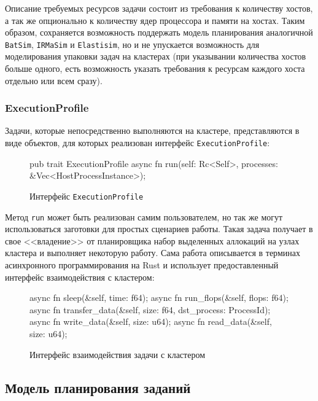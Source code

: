 Описание требуемых ресурсов задачи состоит из требования к количеству хостов, а так же опционально к количеству ядер процессора и памяти на хостах. Таким образом, сохраняется возможность поддержать модель планирования аналогичной \texttt{BatSim}, \texttt{IRMaSim} и \texttt{Elastisim}, но и не упускается возможность для моделирования упаковки задач на кластерах (при указывании количества хостов больше одного,  есть возможность указать требования к ресурсам каждого хоста отдельно или всем сразу).

\subsubsection{ExecutionProfile}\label{sec:execution-profile}

Задачи, которые непосредственно выполняются на кластере, представляются в виде объектов, для которых реализован интерфейс \texttt{ExecutionProfile}:

\begin{figure}[h!]
    \small
\begin{rustcode}
pub trait ExecutionProfile {
  async fn run(self: Rc<Self>, processes: &Vec<HostProcessInstance>);
}
\end{rustcode}
\caption{Интерфейс \texttt{ExecutionProfile}}
\end{figure}

Метод \texttt{run} может быть реализован самим пользователем, но так же могут использоваться заготовки для простых сценариев работы. Такая задача получает в свое <<владение>> от планировщика набор выделенных аллокаций на узлах кластера и выполняет некоторую работу. Сама работа описывается в терминах асинхронного программирования на Rust и использует предоставленный интерфейс взаимодействия с кластером: 


\begin{figure}[h!]
    \small
\begin{rustcode}
    async fn sleep(&self, time: f64);
    async fn run_flops(&self, flops: f64);
    async fn transfer_data(&self, size: f64, dst_process: ProcessId);
    async fn write_data(&self, size: u64);
    async fn read_data(&self, size: u64);
\end{rustcode}
\caption{Интерфейс взаимодействия задачи с кластером}
\end{figure}

\subsection{Модель планирования заданий}

